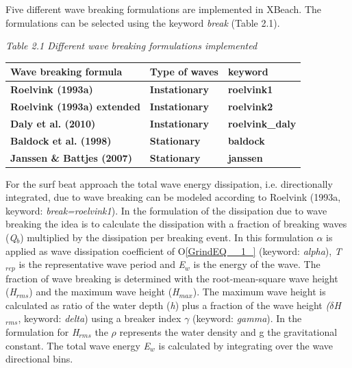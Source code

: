 \documentclass{article}
\begin{document}
\noindent Five different wave breaking formulations are implemented in XBeach. The formulations can be selected using the keyword \textit{break }(\eject Table 2.1). 

\noindent 

\noindent \eject \textit{}

\noindent \textit{Table 2.1 Different wave breaking formulations implemented}

\begin{tabular}{|p{1.3in}|p{1.4in}|p{1.4in}|} \hline 
\textbf{Wave breaking formula} & \textbf{Type of waves} & \textbf{keyword} \\ \hline 
\textbf{Roelvink (1993a)} & \textbf{Instationary} & \textbf{roelvink1} \\ \hline 
\textbf{Roelvink (1993a) extended} & \textbf{Instationary} & \textbf{roelvink2} \\ \hline 
\textbf{Daly et al. (2010)} & \textbf{Instationary} & \textbf{roelvink\_daly} \\ \hline 
\textbf{Baldock et al. (1998)} & \textbf{Stationary} & \textbf{baldock} \\ \hline 
\textbf{Janssen \& Battjes (2007)} & \textbf{Stationary} & \textbf{janssen} \\ \hline 
\end{tabular}



\noindent For the surf beat approach the total wave energy dissipation, i.e. directionally integrated, due to wave breaking can be modeled according to Roelvink (1993a, keyword: \textit{break=roelvink1}). In the formulation of the dissipation due to wave breaking the idea is to calculate the dissipation with a fraction of breaking waves (\textit{Q${}_{b}$}) multiplied by the dissipation per breaking event. In this formulation \textit{$\alpha $ }is applied as wave dissipation coefficient of O\eqref{GrindEQ__1_} (keyword: \textit{alpha}), \textit{T${}_{rep}$ }is the representative wave period and \textit{E${}_{w}$} is the energy of the wave. The fraction of wave breaking is determined with the root-mean-square wave height (\textit{H${}_{rms}$}) and the maximum wave height (\textit{H${}_{max}$}). The maximum wave height is calculated as ratio of the water depth (\textit{h}) plus a fraction of the wave height \textit{($\delta $H${}_{rms}$}, keyword: \textit{delta}) using a breaker index \textit{$\gamma $ }(keyword:\textit{ gamma}). In the formulation for \textit{H${}_{rms}$} the \textit{$\rho $} represents the water density and g the gravitational constant. The total wave energy \textit{E${}_{w}$} is calculated by integrating over the wave directional bins. 
\end{document}
